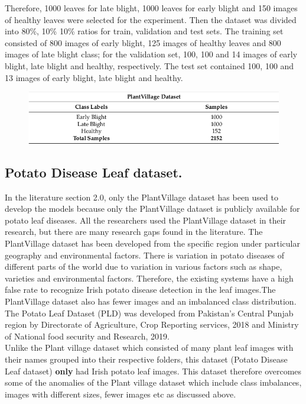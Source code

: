 \documentclass[11pt]{report}
\begin{document}
Therefore, 1000 leaves for
late blight, 1000 leaves for early blight and 150 images of healthy leaves were selected for
the experiment. Then the dataset was divided into 80\%, 10\% 10\% ratios for train, validation
and test sets. The training set consisted of 800 images of early blight, 125 images of healthy
leaves and 800 images of late blight class; for the validation set, 100, 100 and 14 images of
early blight, late blight and healthy, respectively. The test set contained 100, 100 and 13
images of early blight, late blight and healthy.\\

\begin{figure}[h]
	\centerline{\small 
		\includegraphics[height=0.1\textheight]  {l3}}
\end{figure}

\subsection{Potato Disease Leaf dataset.}
In the literature section 2.0, only the PlantVillage dataset has been used to develop the models
because only the PlantVillage dataset is publicly available for potato leaf diseases. All the
researchers used the PlantVillage dataset in their research, but there are many research
gaps found in the literature. The PlantVillage dataset has been developed from the specific
region under particular geography and environmental factors. There is variation in potato
diseases of different parts of the world due to variation in various factors such as shape,
varieties and environmental factors. Therefore, the existing systems have a high false
rate to recognize Irish potato disease detection in the leaf images.The PlantVillage dataset also has fewer images and an imbalanced
class distribution.\\


The Potato Leaf Dataset (PLD) was developed from Pakistan’s Central
Punjab region by Directorate of Agriculture, Crop Reporting services, 2018 and Ministry of National food security and Research, 2019.\\

Unlike the Plant village dataset which consisted of many plant leaf images with their names grouped into their respective folders, this dataset (Potato Disease Leaf dataset) \textbf{only} had Irish potato leaf images. This dataset therefore overcomes some of the anomalies of the Plant village dataset which include class imbalances, images with different sizes, fewer images etc as discussed above.\\
\end{document}
